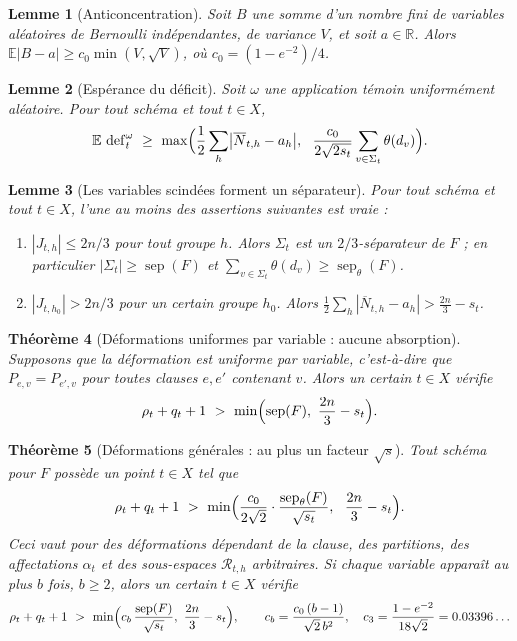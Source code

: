 \documentclass[11pt,a4paper]{article}
\newtheorem{theorem}{Théorème}[section]
\newtheorem{lemma}[theorem]{Lemme}
\theoremstyle{definition}
\theoremstyle{remark}
\newcommand{\E}{\mathbb{E}}
\newcommand{\cR}{\mathcal{R}}
\newcommand{\sep}{\operatorname{sep}}
\newcommand{\sepw}{\operatorname{sep}_{\theta}}
\newcommand{\dfc}{\operatorname{def}}
\newcommand{\Nbar}{\overline{N}}
\begin{document}
\begin{lemma}[Anticoncentration]\label{lem:anti}
Soit $B$ une somme d'un nombre fini de variables aléatoires de Bernoulli indépendantes, de
variance $V$, et soit $a\in\mathbb R$. Alors $\E|B-a|\ge c_0\min(V,\sqrt V)$, où
$c_0=(1-e^{-2})/4$.
\end{lemma}

\begin{lemma}[Espérance du déficit]\label{lem:expdef}
Soit $\omega$ une application témoin uniformément aléatoire. Pour tout schéma et tout
$t\in X$,
\[
\E\,\dfc^\omega_t\ \ge\ \max\Bigl(\frac12\sum_h\bigl|\Nbar_{t,h}-a_h\bigr|,\ \
\frac{c_0}{2\sqrt{2s_t}}\sum_{v\in\Sigma_t}\theta(d_v)\Bigr).
\]
\end{lemma}

\begin{lemma}[Les variables scindées forment un séparateur]\label{lem:split}
Pour tout schéma et tout $t\in X$, l'une au moins des assertions suivantes est vraie :
\begin{enumerate}
\item[\textup{(1)}] $|J_{t,h}|\le 2n/3$ pour tout groupe $h$. Alors $\Sigma_t$ est un
 $2/3$-séparateur de $F$ ; en particulier $|\Sigma_t|\ge\sep(F)$ et
 $\sum_{v\in\Sigma_t}\theta(d_v)\ge\sepw(F)$.
\item[\textup{(2)}] $|J_{t,h_0}|>2n/3$ pour un certain groupe $h_0$. Alors
 $\frac12\sum_h|\Nbar_{t,h}-a_h|>\frac{2n}{3}-s_t$.
\end{enumerate}
\end{lemma}

\begin{theorem}[Déformations uniformes par variable : aucune absorption]\label{thm:uniform}
Supposons que la déformation est uniforme par variable, c'est-à-dire que
$P_{e,v}=P_{e',v}$ pour toutes clauses $e,e'$ contenant $v$. Alors un certain $t\in X$
vérifie
\[
\rho_t+q_t+1\ >\ \min\Bigl(\sep(F),\ \frac{2n}{3}-s_t\Bigr).
\]
\end{theorem}

\begin{theorem}[Déformations générales : au plus un facteur $\sqrt s$]\label{thm:general}
Tout schéma pour $F$ possède un point $t\in X$ tel que
\[
\rho_t+q_t+1\ >\ \min\Bigl(\frac{c_0}{2\sqrt2}\cdot\frac{\sepw(F)}{\sqrt{s_t}},\ \
\frac{2n}{3}-s_t\Bigr).
\]
Ceci vaut pour des déformations dépendant de la clause, des partitions, des affectations
$\alpha_t$ et des sous-espaces $\cR_{t,h}$ arbitraires. Si chaque variable apparaît au plus
$b$ fois, $b\ge2$, alors un certain $t\in X$ vérifie
\[
\rho_t+q_t+1\ >\ \min\Bigl(c_b\,\frac{\sep(F)}{\sqrt{s_t}},\ \frac{2n}{3}-s_t\Bigr),
\qquad c_b=\frac{c_0\,(b-1)}{\sqrt2\,b^2},\quad c_3=\frac{1-e^{-2}}{18\sqrt2}=0.03396\ldots
\]
\end{theorem}
\end{document}
